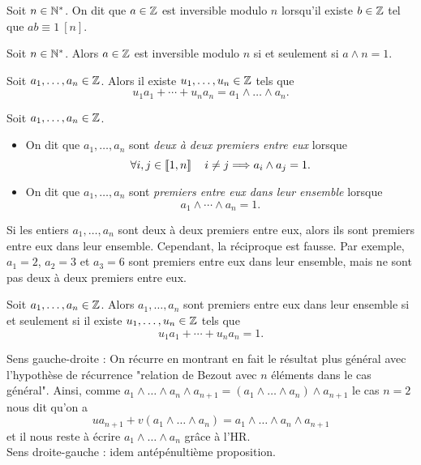 \documentclass{magnolia}
\begin{document}
\begin{definition}
Soit $n\in{\mathbb{N}^*}$. On dit que $a\in\mathbb{Z}$ est inversible modulo $n$ lorsqu'il existe $b\in\mathbb{Z}$
tel que $ab\equiv 1\ [n]$.
\end{definition}

\begin{proposition}
Soit $n\in{\mathbb{N}^*}$. Alors $a\in\mathbb{Z}$ est inversible modulo $n$ si et seulement si $a\wedge n=1$.
\end{proposition}


\begin{proposition}
Soit $a_1,\ldots,a_n\in\mathbb{Z}$. Alors il existe $u_1,\ldots,u_n\in\mathbb{Z}$ tels que
\[u_1 a_1+\cdots+u_n a_n = a_1\wedge \ldots\wedge a_n.\]
\end{proposition}


\begin{definition}
Soit $a_1,\ldots,a_n\in\mathbb{Z}$.
\begin{itemize}
\item On dit que $a_1,\ldots,a_n$ sont \emph{deux à deux premiers entre eux} lorsque
  \[\forall i,j\in\left\llbracket 1,n\right\rrbracket \quad i\neq j \Longrightarrow a_i\wedge a_j=1.\]
\item On dit que $a_1,\ldots,a_n$ sont \emph{premiers entre eux dans leur ensemble} lorsque
  \[a_1\wedge\cdots\wedge a_n=1.\]
\end{itemize}
\end{definition}

\begin{remarqueUnique}
\remarque Si les entiers $a_1,\ldots,a_n$ sont deux à deux premiers entre eux, alors
  ils sont premiers entre eux dans leur ensemble. Cependant, la réciproque est fausse.
  Par exemple, $a_1=2$, $a_2=3$ et $a_3=6$
  sont premiers entre eux dans leur ensemble, mais ne sont pas deux à deux premiers
  entre eux.
\end{remarqueUnique}

\begin{proposition}
Soit $a_1,\ldots,a_n\in\mathbb{Z}$. Alors $a_1,\ldots,a_n$ sont premiers entre eux dans leur
ensemble si et seulement si il existe $u_1,\ldots,u_n\in\mathbb{Z}$ tels que
\[u_1 a_1+\cdots+u_n a_n=1.\]
\end{proposition}

\begin{preuve}
Sens gauche-droite : On récurre en montrant en fait le résultat plus général avec l'hypothèse de récurrence "relation de Bezout avec $n$ éléments dans le cas général". Ainsi, comme $a_1\wedge \ldots \wedge a_n \wedge a_{n+1}=(a_1\wedge \ldots \wedge a_n) \wedge a_{n+1}$ le cas $n=2$ nous dit qu'on a $$ua_{n+1}+v(a_1\wedge \ldots \wedge a_n)=a_1\wedge \ldots \wedge a_n \wedge a_{n+1}$$ et il nous reste à écrire $a_1\wedge \ldots \wedge a_n$ grâce à l'HR.\\
Sens droite-gauche : idem antépénultième proposition.
\end{preuve}
\end{document}
